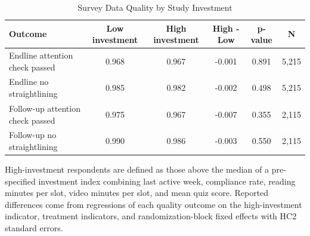 \begin{table}[H]
\centering
\caption{Survey Data Quality by Study Investment}
\label{tab:data_quality_by_investment}
\footnotesize
\begin{threeparttable}
\begin{tabular}{lccccc}
\toprule
Outcome & Low investment & High investment & High - Low & p-value & N \\
\midrule
Endline attention check passed & 0.968 & 0.967 & -0.001 & 0.891 & 5,215 \\
Endline no straightlining & 0.985 & 0.982 & -0.002 & 0.498 & 5,215 \\
Follow-up attention check passed & 0.975 & 0.967 & -0.007 & 0.355 & 2,115 \\
Follow-up no straightlining & 0.990 & 0.986 & -0.003 & 0.550 & 2,115 \\
\bottomrule
\end{tabular}
\begin{tablenotes}[flushleft]
\footnotesize
\item High-investment respondents are defined as those above the median of a pre-specified investment index combining last active week, compliance rate, reading minutes per slot, video minutes per slot, and mean quiz score. Reported differences come from regressions of each quality outcome on the high-investment indicator, treatment indicators, and randomization-block fixed effects with HC2 standard errors.
\end{tablenotes}
\end{threeparttable}
\end{table}
